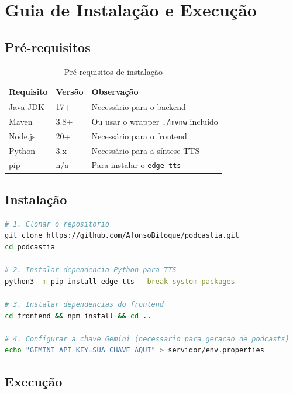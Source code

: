 \documentclass[12pt, a4paper]{report}
\begin{document}
\chapter{Guia de Instalação e Execução}
\label{chap:instalacao}

\section{Pré-requisitos}

\begin{table}[H]
  \centering
  \begin{tabular}{lll}
    \toprule
    \textbf{Requisito} & \textbf{Versão} & \textbf{Observação} \\
    \midrule
    Java JDK  & 17+  & Necessário para o backend \\
    Maven     & 3.8+ & Ou usar o wrapper \texttt{./mvnw} incluído \\
    Node.js   & 20+  & Necessário para o frontend \\
    Python    & 3.x  & Necessário para a síntese TTS \\
    pip       & n/a  & Para instalar o \texttt{edge-tts} \\
    \bottomrule
  \end{tabular}
  \caption{Pré-requisitos de instalação}
\end{table}

\section{Instalação}

\begin{lstlisting}[language=bash, caption={Passos de instalação}]
# 1. Clonar o repositorio
git clone https://github.com/AfonsoBitoque/podcastia.git
cd podcastia

# 2. Instalar dependencia Python para TTS
python3 -m pip install edge-tts --break-system-packages

# 3. Instalar dependencias do frontend
cd frontend && npm install && cd ..

# 4. Configurar a chave Gemini (necessario para geracao de podcasts)
echo "GEMINI_API_KEY=SUA_CHAVE_AQUI" > servidor/env.properties
\end{lstlisting}

\section{Execução}
\end{document}
